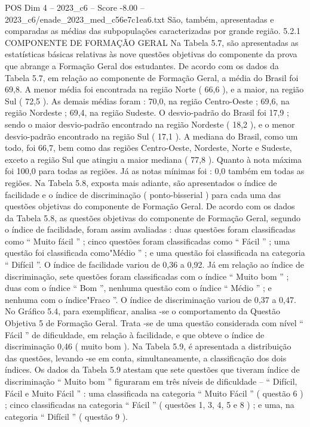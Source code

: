 \begin{textsample}{POS Dim 4 – 2023\_c6 – Score -8.00 – 2023\_c6/enade\_2023\_med\_c56e7c1ea6.txt}
São, também, apresentadas e comparadas as médias das subpopulações caracterizadas por grande região. 5.2.1 COMPONENTE DE FORMAÇÃO GERAL Na Tabela 5.7, são apresentadas as estatísticas básicas relativas às nove questões objetivas do componente da prova que abrange a Formação Geral dos estudantes.
De acordo com os dados da Tabela 5.7, em relação ao componente de Formação Geral, a média do Brasil foi 69,8.
A menor média foi encontrada na região Norte ( 66,6 ), e a maior, na região Sul ( 72,5 ).
As demais médias foram : 70,0, na região Centro-Oeste ; 69,6, na região Nordeste ; 69,4, na região Sudeste.
O desvio-padrão do Brasil foi 17,9 ; sendo o maior desvio-padrão encontrado na região Nordeste ( 18,2 ), e o menor desvio-padrão encontrado na região Sul ( 17,1 ).
A mediana do Brasil, como um todo, foi 66,7, bem como das regiões Centro-Oeste, Nordeste, Norte e Sudeste, exceto a região Sul que atingiu a maior mediana ( 77,8 ).
Quanto à nota máxima foi 100,0 para todas as regiões.
Já as notas mínimas foi : 0,0 também em todas as regiões.
Na Tabela 5.8, exposta mais adiante, são apresentados o índice de facilidade e o índice de discriminação ( ponto-bisserial ) para cada uma das questões objetivas do componente de Formação Geral.
De acordo com os dados da Tabela 5.8, as questões objetivas do componente de Formação Geral, segundo o índice de facilidade, foram assim avaliadas : duas questões foram classificadas como “ Muito fácil ” ; cinco questões foram classificadas como “ Fácil ” ; uma questão foi classificada como"Médio ” ; e uma questão foi classificada na categoria “ Difícil ”.
O índice de facilidade variou de 0,36 a 0,92.
Já em relação ao índice de discriminação, sete questões foram classificadas com o índice “ Muito bom ” ; duas com o índice “ Bom ”, nenhuma questão com o índice “ Médio ” ; e nenhuma com o índice"Fraco ”.
O índice de discriminação variou de 0,37 a 0,47.
No Gráfico 5.4, para exemplificar, analisa -se o comportamento da Questão Objetiva 5 de Formação Geral.
Trata -se de uma questão considerada com nível “ Fácil ” de dificuldade, em relação à facilidade, e que obteve o índice de discriminação 0,46 ( muito bom ).
Na Tabela 5.9, é apresentada a distribuição das questões, levando -se em conta, simultaneamente, a classificação dos dois índices.
Os dados da Tabela 5.9 atestam que sete questões que tiveram índice de discriminação “ Muito bom ” figuraram em três níveis de dificuldade – “ Difícil, Fácil e Muito Fácil ” : uma classificada na categoria “ Muito Fácil ” ( questão 6 ) ; cinco classificadas na categoria “ Fácil ” ( questões 1, 3, 4, 5 e 8 ) ; e uma, na categoria “ Difícil ” ( questão 9 ).

\end{textsample}
